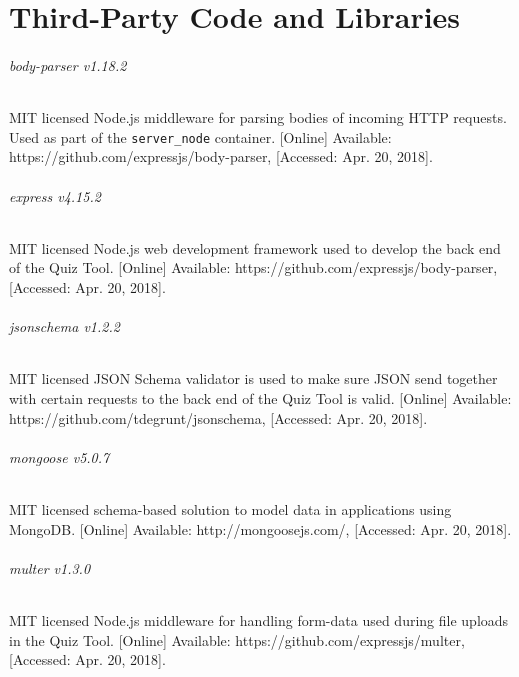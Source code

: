 \chapter{Third-Party Code and Libraries}
%
%
%
%
%

\subparagraph{body-parser v1.18.2}
MIT licensed Node.js middleware for parsing bodies of incoming HTTP requests. Used as part of the
\texttt{server\_node} container. [Online] Available: https://github.com/expressjs/body-parser, [Accessed: Apr. 20, 2018].

\subparagraph{express v4.15.2}
MIT licensed Node.js web development framework used to develop the back end of the Quiz Tool.
[Online] Available: https://github.com/expressjs/body-parser, [Accessed: Apr. 20, 2018].

\subparagraph{jsonschema v1.2.2}
MIT licensed JSON Schema validator is used to make sure JSON send together with certain requests to the
back end of the Quiz Tool is valid. [Online] Available: https://github.com/tdegrunt/jsonschema, [Accessed: Apr. 20, 2018].

\subparagraph{mongoose v5.0.7}
MIT licensed schema-based solution to model data in applications using MongoDB.
[Online] Available: http://mongoosejs.com/, [Accessed: Apr. 20, 2018].

\subparagraph{multer v1.3.0}
MIT licensed Node.js middleware for handling form-data used during file uploads in
the Quiz Tool. [Online] Available: https://github.com/expressjs/multer, [Accessed: Apr. 20, 2018].

